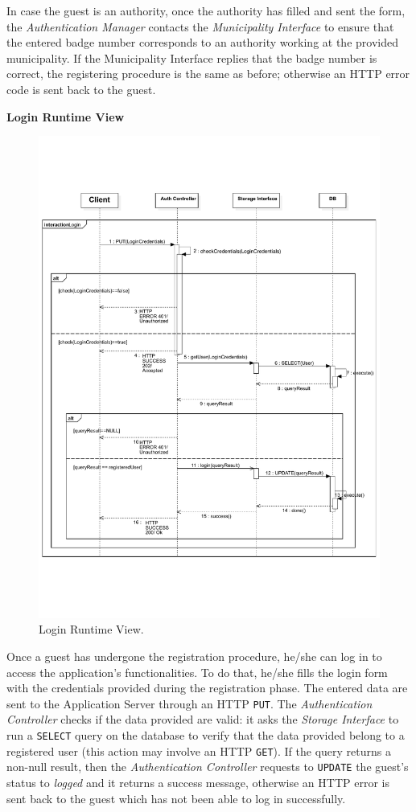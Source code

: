 \documentclass{report}
\begin{document}
In case the guest is an authority, once the authority has filled and sent the form, the \textit{Authentication Manager} contacts the \textit{Municipality Interface} to ensure that the entered badge number corresponds to an authority working at the provided municipality. If the Municipality Interface replies that the badge number is correct, the registering procedure is the same as before; otherwise an HTTP error code is sent back to the guest.   \vspace{2mm} 
\begin{center}\large{\textbf{Login Runtime View}}\end{center}
\begin{figure}[H]
	\begin{center}
	\includegraphics[width=.78\textwidth]{img/Loginn.pdf}
    \end{center}
    \label{fig:LoginSD}
	\caption{Login Runtime View.}
\end{figure}
Once a guest has undergone the registration procedure, he/she can log in to access the application's functionalities. To do that, he/she fills the login form with the credentials provided during the registration phase. The entered data are sent to the Application Server through an HTTP \texttt{PUT}. The \textit{Authentication Controller} checks if the data provided are valid: it asks the \textit{Storage Interface} to run a \texttt{SELECT} query on the database to verify that the data provided belong to a registered user (this action may involve an HTTP \texttt{GET}). If the query returns a non-null result, then the \textit{Authentication Controller} requests to \texttt{UPDATE} the guest's status to \textit{logged} and it returns a success message, otherwise an HTTP error is sent back to the guest which has not been able to log in successfully.
\end{document}
